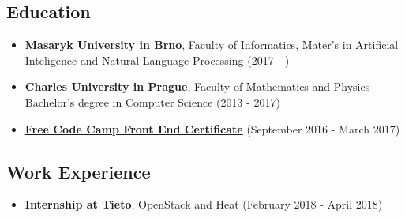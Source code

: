 \documentclass[a4,12pt]{article}
\begin{document}
\subsection*{Education}\label{education}

\begin{itemize}
\item
  \textbf{Masaryk University in Brno}, Faculty of Informatics, Mater's
  in Artificial Inteligence and Natural Language Processing (2017 - )
\item
  \textbf{Charles University in Prague}, Faculty of Mathematics and
  Physics\\
  Bachelor's degree in Computer Science (2013 - 2017)
\item
  \textbf{\href{https://www.freecodecamp.com/lordmathis/front-end-certification}{Free
  Code Camp Front End Certificate}} (September 2016 - March 2017)
\end{itemize}

\subsection*{Work Experience}\label{work}

\begin{itemize}
\item
  \textbf{Internship at Tieto}, OpenStack and Heat (February 2018 - April 2018)
\end{itemize}
\end{document}
